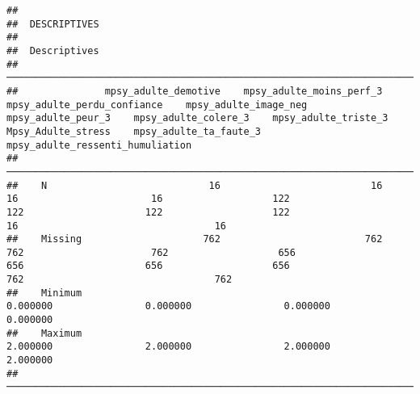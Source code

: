 \documentclass[
]{article}
\begin{document}
\begin{verbatim}
## 
##  DESCRIPTIVES
## 
##  Descriptives                                                                                                                                                                                                                                                                      
##  ───────────────────────────────────────────────────────────────────────────────────────────────────────────────────────────────────────────────────────────────────────────────────────────────────────────────────────────────────────────────────────────────────────────────── 
##               mpsy_adulte_demotive    mpsy_adulte_moins_perf_3    mpsy_adulte_perdu_confiance    mpsy_adulte_image_neg    mpsy_adulte_peur_3    mpsy_adulte_colere_3    mpsy_adulte_triste_3    Mpsy_Adulte_stress    mpsy_adulte_ta_faute_3    mpsy_adulte_ressenti_humuliation   
##  ───────────────────────────────────────────────────────────────────────────────────────────────────────────────────────────────────────────────────────────────────────────────────────────────────────────────────────────────────────────────────────────────────────────────── 
##    N                            16                          16                             16                       16                   122                     122                     122                   122                        16                                  16   
##    Missing                     762                         762                            762                      762                   656                     656                     656                   656                       762                                 762   
##    Minimum                                                                                                                          0.000000                0.000000                0.000000              0.000000                                                                 
##    Maximum                                                                                                                          2.000000                2.000000                2.000000              2.000000                                                                 
##  ─────────────────────────────────────────────────────────────────────────────────────────────────────────────────────────────────────────────────────────────────────────────────────────────────────────────────────────────────────────────────────────────────────────────────
\end{verbatim}
\end{document}

